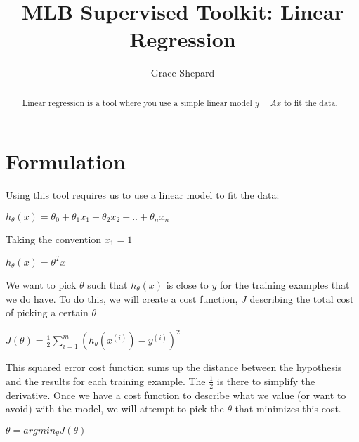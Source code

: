 \documentclass{article}
\begin{document}
\title{MLB Supervised Toolkit: Linear Regression}
\author{Grace Shepard}

\maketitle

\begin{abstract}
Linear regression is a tool where you use a simple linear model $y=Ax$ to fit the data.
\end{abstract}


\section{Formulation}
Using this tool requires us to use a linear model to fit the data:\\

\begin{center}
$h_{\theta}(x) = \theta_0 + \theta_1x_1 + \theta_2x_2 + .. + \theta_nx_n$\\
\end{center}

\begin{flushright}Taking the convention $x_1 = 1$\\
\end{flushright}

\begin{center}
$h_{\theta}(x) = \theta^Tx$ \\
\end{center}

We want to pick $\theta$ such that $h_\theta(x)$ is close to $y$ for the training examples that we do have. To do this, we will create a cost function, $J$ describing the total cost of picking a certain $\theta$\\

\begin{center}
$J(\theta) = \frac{1}{2} \sum_{i=1}^m {(h_\theta(x^{(i)}) - y^{(i)})}^2$ \\
\end{center}

This squared error cost function sums up the distance between the hypothesis and the results for each training example. The $\frac{1}{2}$ is there to simplify the derivative. Once we have a cost function to describe what we value (or want to avoid) with the model, we will attempt to pick the $\theta$ that minimizes this cost.\\

\begin{center}
$\theta = argmin_\theta J(\theta)$\\
\end{center}
\end{document}
